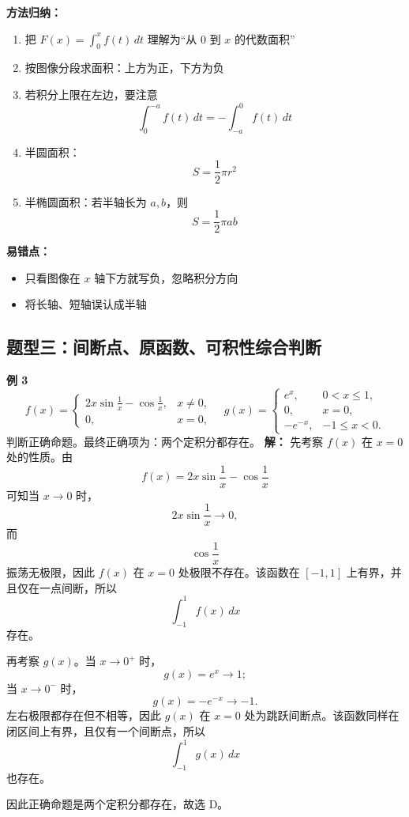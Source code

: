 \documentclass[12pt,a4paper]{ctexart}
\begin{document}
\textbf{方法归纳：}
\begin{enumerate}
  \item 把 $F(x)=\int_0^x f(t)\,dt$ 理解为“从 $0$ 到 $x$ 的代数面积”
  \item 按图像分段求面积：上方为正，下方为负
  \item 若积分上限在左边，要注意
  \[
  \int_0^{-a}f(t)\,dt=-\int_{-a}^0 f(t)\,dt
  \]
  \item 半圆面积：
  \[
  S=\frac12\pi r^2
  \]
  \item 半椭圆面积：若半轴长为 $a,b$，则
  \[
  S=\frac12\pi ab
  \]
\end{enumerate}

\textbf{易错点：}
\begin{itemize}
  \item 只看图像在 $x$ 轴下方就写负，忽略积分方向
  \item 将长轴、短轴误认成半轴
\end{itemize}

\subsection{题型三：间断点、原函数、可积性综合判断}

\begin{examplebox}
\textbf{例 3}\quad
\[
f(x)=
\begin{cases}
2x\sin\frac1x-\cos\frac1x,& x\ne 0,\\
0,&x=0,
\end{cases}
\quad
g(x)=
\begin{cases}
e^x,&0<x\le 1,\\
0,&x=0,\\
-e^{-x},&-1\le x<0.
\end{cases}
\]
判断正确命题。最终正确项为：两个定积分都存在。
\textbf{解：}
先考察 $f(x)$ 在 $x=0$ 处的性质。由
\[
f(x)=2x\sin\frac1x-\cos\frac1x
\]
可知当 $x\to 0$ 时，
\[
2x\sin\frac1x\to 0,
\]
而
\[
\cos\frac1x
\]
振荡无极限，因此 $f(x)$ 在 $x=0$ 处极限不存在。该函数在 $[-1,1]$ 上有界，并且仅在一点间断，所以
\[
\int_{-1}^1 f(x)\,dx
\]
存在。

再考察 $g(x)$。当 $x\to 0^+$ 时，
\[
g(x)=e^x\to 1;
\]
当 $x\to 0^-$ 时，
\[
g(x)=-e^{-x}\to -1.
\]
左右极限都存在但不相等，因此 $g(x)$ 在 $x=0$ 处为跳跃间断点。该函数同样在闭区间上有界，且仅有一个间断点，所以
\[
\int_{-1}^1 g(x)\,dx
\]
也存在。

因此正确命题是两个定积分都存在，故选 D。
\end{examplebox}
\end{document}
